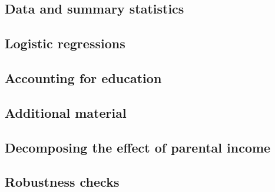 \begin{refsection}
    \subsection{Data and summary statistics}\label{chap2-app-data}
    
    \clearpage
    \subsection{Logistic regressions}\label{chap2-app-logit}
    
    \clearpage
    \subsection{Accounting for education} \label{chap2-app-education}
    
    \clearpage
    \subsection{Additional material}\label{chap2-app-additional}
    
    \clearpage
    \subsection{Decomposing the effect of parental income}\label{chap2-app-decomposing}
    
    \clearpage
    \subsection{Robustness checks}\label{chap2-app-robustness}
    

\end{refsection}